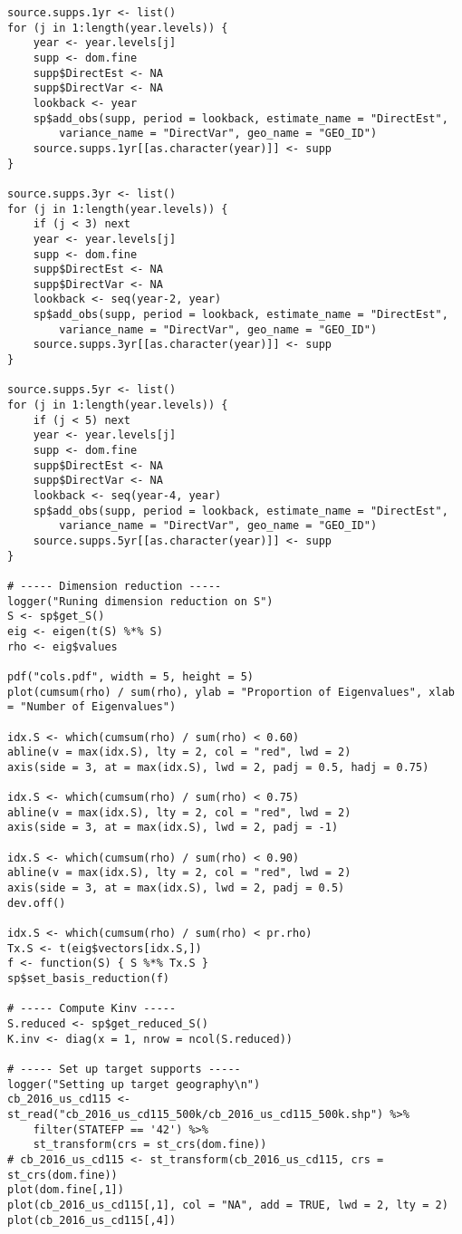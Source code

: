 \documentclass[12pt]{article}
\begin{document}
\begin{footnotesize}
\begin{verbatim}
source.supps.1yr <- list()
for (j in 1:length(year.levels)) {
    year <- year.levels[j]
    supp <- dom.fine
    supp$DirectEst <- NA
    supp$DirectVar <- NA
    lookback <- year
    sp$add_obs(supp, period = lookback, estimate_name = "DirectEst",
        variance_name = "DirectVar", geo_name = "GEO_ID")
    source.supps.1yr[[as.character(year)]] <- supp
}

source.supps.3yr <- list()
for (j in 1:length(year.levels)) {
    if (j < 3) next
    year <- year.levels[j]
    supp <- dom.fine
    supp$DirectEst <- NA
    supp$DirectVar <- NA
    lookback <- seq(year-2, year)
    sp$add_obs(supp, period = lookback, estimate_name = "DirectEst",
        variance_name = "DirectVar", geo_name = "GEO_ID")
    source.supps.3yr[[as.character(year)]] <- supp
}

source.supps.5yr <- list()
for (j in 1:length(year.levels)) {
    if (j < 5) next
    year <- year.levels[j]
    supp <- dom.fine
    supp$DirectEst <- NA
    supp$DirectVar <- NA
    lookback <- seq(year-4, year)
    sp$add_obs(supp, period = lookback, estimate_name = "DirectEst",
        variance_name = "DirectVar", geo_name = "GEO_ID")
    source.supps.5yr[[as.character(year)]] <- supp
}

# ----- Dimension reduction -----
logger("Runing dimension reduction on S")
S <- sp$get_S()
eig <- eigen(t(S) %*% S)
rho <- eig$values

pdf("cols.pdf", width = 5, height = 5)
plot(cumsum(rho) / sum(rho), ylab = "Proportion of Eigenvalues", xlab = "Number of Eigenvalues")

idx.S <- which(cumsum(rho) / sum(rho) < 0.60)
abline(v = max(idx.S), lty = 2, col = "red", lwd = 2)
axis(side = 3, at = max(idx.S), lwd = 2, padj = 0.5, hadj = 0.75)

idx.S <- which(cumsum(rho) / sum(rho) < 0.75)
abline(v = max(idx.S), lty = 2, col = "red", lwd = 2)
axis(side = 3, at = max(idx.S), lwd = 2, padj = -1)

idx.S <- which(cumsum(rho) / sum(rho) < 0.90)
abline(v = max(idx.S), lty = 2, col = "red", lwd = 2)
axis(side = 3, at = max(idx.S), lwd = 2, padj = 0.5)
dev.off()

idx.S <- which(cumsum(rho) / sum(rho) < pr.rho)
Tx.S <- t(eig$vectors[idx.S,])
f <- function(S) { S %*% Tx.S }
sp$set_basis_reduction(f)

# ----- Compute Kinv -----
S.reduced <- sp$get_reduced_S()
K.inv <- diag(x = 1, nrow = ncol(S.reduced))

# ----- Set up target supports -----
logger("Setting up target geography\n")
cb_2016_us_cd115 <- st_read("cb_2016_us_cd115_500k/cb_2016_us_cd115_500k.shp") %>%
    filter(STATEFP == '42') %>%
    st_transform(crs = st_crs(dom.fine))
# cb_2016_us_cd115 <- st_transform(cb_2016_us_cd115, crs = st_crs(dom.fine))
plot(dom.fine[,1])
plot(cb_2016_us_cd115[,1], col = "NA", add = TRUE, lwd = 2, lty = 2)
plot(cb_2016_us_cd115[,4])


\end{verbatim}
\end{footnotesize}
\end{document}
